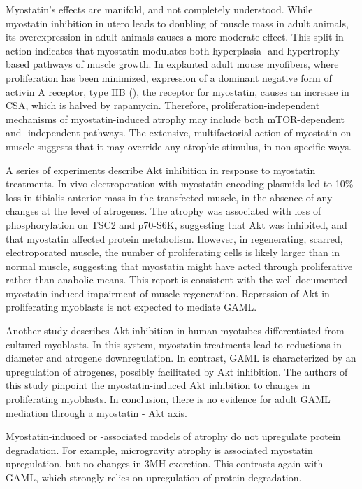 \documentclass[12pt,english]{report}\usepackage[]{graphicx}\usepackage[]{color}
\begin{document}
Myostatin's effects are manifold, and not completely understood. While
myostatin inhibition in utero leads to doubling of muscle mass in
adult animals\citep{mcpherron1997regulation}, its overexpression
in adult animals causes a more moderate effect\citep{zimmers2002induction}.
This split in action indicates that myostatin modulates both hyperplasia-
and hypertrophy-based pathways of muscle growth. In explanted adult
mouse myofibers, where proliferation has been minimized, expression
of a dominant negative form of activin A receptor, type IIB (),
the receptor for myostatin, causes an increase in CSA, which is halved
by rapamycin\citep{sartori2009smad2}. Therefore, proliferation-independent
mechanisms of myostatin-induced atrophy may include both mTOR-dependent
and -independent pathways. The extensive, multifactorial action of
myostatin on muscle suggests that it may override any atrophic stimulus,
in non-specific ways.

A series of experiments describe Akt inhibition in response to myostatin
treatments. In vivo electroporation with myostatin-encoding plasmids
led to 10\% loss in tibialis anterior mass in the transfected muscle,
in the absence of any changes at the level of atrogenes\citep{amirouche2009down-regulation}.
The atrophy was associated with loss of phosphorylation on TSC2 and
p70-S6K, suggesting that Akt was inhibited, and that myostatin affected
protein metabolism. However, in regenerating, scarred, electroporated
muscle, the number of proliferating cells is likely larger than in
normal muscle, suggesting that myostatin might have acted through
proliferative rather than anabolic means. This report is consistent
with the well-documented myostatin-induced impairment of muscle regeneration\citep{mccroskery2003myostatin,cohen2015genetic}.
Repression of Akt in proliferating myoblasts is not expected to mediate
GAML.

Another study describes Akt inhibition in human myotubes differentiated
from cultured myoblasts. In this system, myostatin treatments lead
to reductions in diameter and atrogene downregulation\citep{trendelenburg2009myostatin}.
In contrast, GAML is characterized by an upregulation of atrogenes,
possibly facilitated by Akt inhibition. The authors of this study
pinpoint the myostatin-induced Akt inhibition to changes in proliferating
myoblasts. In conclusion, there is no evidence for adult GAML mediation
through a myostatin - Akt axis.

Myostatin-induced or -associated models of atrophy do not upregulate
protein degradation. For example, microgravity atrophy is associated
myostatin upregulation, but no changes in 3MH excretion\citep{lalani2000myostatin}.
This contrasts again with GAML, which strongly relies on upregulation
of protein degradation.
\end{document}
